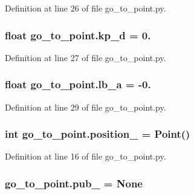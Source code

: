 Definition at line 26 of file go\+\_\+to\+\_\+point.\+py.

\subsubsection[{\texorpdfstring{kp\+\_\+d}{kp_d}}]{\setlength{\rightskip}{0pt plus 5cm}float go\+\_\+to\+\_\+point.\+kp\+\_\+d = 0.}\hypertarget{namespacego__to__point_a7bc498652ca66932e704e738b50c297b}{}\label{namespacego__to__point_a7bc498652ca66932e704e738b50c297b}


Definition at line 27 of file go\+\_\+to\+\_\+point.\+py.

\subsubsection[{\texorpdfstring{lb\+\_\+a}{lb_a}}]{\setlength{\rightskip}{0pt plus 5cm}float go\+\_\+to\+\_\+point.\+lb\+\_\+a = -\/0.}\hypertarget{namespacego__to__point_afecad4058844db05d8321199e25b4498}{}\label{namespacego__to__point_afecad4058844db05d8321199e25b4498}


Definition at line 29 of file go\+\_\+to\+\_\+point.\+py.

\subsubsection[{\texorpdfstring{position\+\_\+}{position_}}]{\setlength{\rightskip}{0pt plus 5cm}int go\+\_\+to\+\_\+point.\+position\+\_\+ = Point()}\hypertarget{namespacego__to__point_a91dbaab25e6080f6b5dbf82cac6ce75c}{}\label{namespacego__to__point_a91dbaab25e6080f6b5dbf82cac6ce75c}


Definition at line 16 of file go\+\_\+to\+\_\+point.\+py.

\subsubsection[{\texorpdfstring{pub\+\_\+}{pub_}}]{\setlength{\rightskip}{0pt plus 5cm}go\+\_\+to\+\_\+point.\+pub\+\_\+ = None}\hypertarget{namespacego__to__point_a57b4090d0abcbcf0bfa2bcb9329d3036}{}\label{namespacego__to__point_a57b4090d0abcbcf0bfa2bcb9329d3036}


